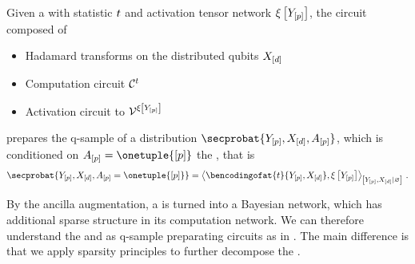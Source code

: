 \begin{theorem}
    Given a \CompActNet{} with statistic $t$ and activation tensor network $\xi\left[Y_{[p]}\right]$, the circuit composed of
    \begin{itemize}
        \item Hadamard transforms on the distributed qubits $X_{[d]}$
        \item Computation circuit $\mathcal{C}^{t}$
        \item Activation circuit to $\mathcal{V}^{\xi\left[Y_{[p]}\right]}$
    \end{itemize}
    prepares the q-sample of a distribution $\secprobat{\headvariables,\shortcatvariables,\avariables}$, which is conditioned on $\avariables=\onetuple{[\seldim]}$ the \CompActNet{}, that is
    \begin{align*}
        \secprobat{\headvariables,\shortcatvariables,\avariables=\onetuple{[\seldim]}}
        = \normalizationof{\bencodingofat{\sstat}{\headvariables,\shortcatvariables},\acttensorat{\headvariables}}{\headvariables,\shortcatvariables} \, .
    \end{align*}
\end{theorem}



By the ancilla augmentation, a \CompActNet{} is turned into a Bayesian network, which has additional sparse structure in its computation network.
We can therefore understand the \computationCircuits{} and \activationCircuits{} as q-sample preparating circuits as in \cite{low_quantum_2014}.
The main difference is that we apply sparsity principles to further decompose the \computationCircuits{}.